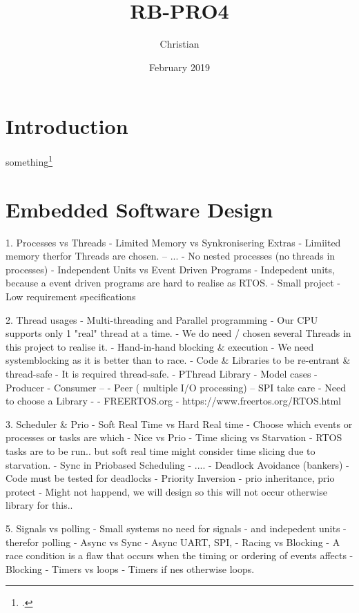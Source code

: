 \documentclass[11pt]{article}
\title{RB-PRO4}
\author{Christian}
\date{February 2019}
\begin{document}

\maketitle

\tableofcontents 
\newpage
{}

\section{Introduction}
something\footcite[]{book}


\section{Embedded Software Design}
1. Processes vs Threads
- Limited Memory vs Synkronisering Extras
    - Limiited memory therfor Threads are chosen. -- ...
    - No nested processes (no threads in processes)
- Independent Units vs Event Driven Programs
    - Indepedent units, because a event driven programs are hard to realise as RTOS.
    - Small project
    - Low requirement specifications

2. Thread usages
- Multi-threading and Parallel programming
    - Our CPU supports only 1 "real" thread at a time.
    - We do need / chosen several Threads in this project to realise it.
- Hand-in-hand blocking \& execution
    - We need systemblocking as it is better than to race.
- Code \& Libraries to be re-entrant \& thread-safe
    - It is required thread-safe. 
- PThread Library
  - Model cases
    - Producer - Consumer --
    - Peer ( multiple I/O processing) -- SPI take care
    - Need to choose a Library - 
    - FREERTOS.org - https://www.freertos.org/RTOS.html

3. Scheduler \& Prio
- Soft Real Time vs Hard Real time
    - Choose which events or processes or tasks are which
    - Nice vs Prio
- Time slicing vs Starvation
    - RTOS tasks are to be run.. but soft real time might consider time slicing due to starvation. 
- Sync in Priobased Scheduling
    - ....
- Deadlock Avoidance (bankers)
    - Code must be tested for deadlocks
- Priority Inversion - prio inheritance, prio protect
    - Might not happend, we will design so this will not occur otherwise library for this..

5. Signals vs polling
    - Small systems no need for signals - and indepedent units - therefor polling
- Async vs Sync
    - Async UART, SPI, 
- Racing vs Blocking - A race condition is a flaw that occurs when the timing or ordering of events affects
    - Blocking
- Timers vs loops
    - Timers if nes otherwise loops.
\end{document}
